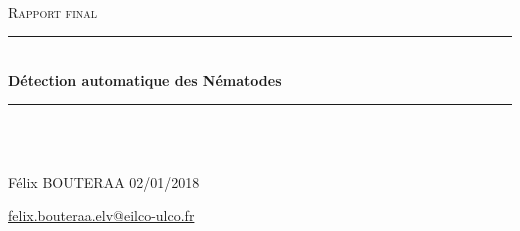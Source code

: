 \documentclass[12pt,a4paper]{article}
\newcommand{\HRule}{\rule{\linewidth}{0.5mm}}
\begin{document}
\begin{titlepage}
  \begin{sffamily}
  \begin{center}
\begin{figure}

\end{figure}

    \\[2.5cm]

    \textsc{\Large Rapport final}\\[1.5cm]

    \HRule \\[0.4cm]
    { \huge \bfseries Détection automatique des Nématodes \\[0.4cm] }
 \HRule \\[1.5cm]
 
 \\[8cm]


        \begin{flushleft}
	Félix BOUTERAA 02/01/2018
	\end{flushleft}  
    
    \begin{flushright}
\href{mailto:felix.bouteraa.elv@eilco-ulco.fr}{felix.bouteraa.elv@eilco-ulco.fr} 
\end{flushright}  

  \end{center}
  \end{sffamily}
\end{titlepage}

\newpage

\tableofcontents

\newpage

\listoffigures

\newpage
\end{document}
